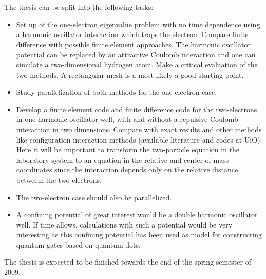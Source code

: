 The thesis can be split into the following tasks:
\begin{itemize}
\item Set up of the one-electron eigenvalue problem with no time dependence using a harmonic 
oscillator interaction which traps the electron. Compare finite difference with possible finite element approaches. The harmonic oscillator potential can be replaced by an attractive Coulomb interaction
and one can simulate a two-dimensional hydrogen atom. Make a critical evaluation of the two
methods.  A rectangular mesh is a most likely a good starting point.
\item Study parallelization  of both methods for the one-electron case.
\item Develop a finite element code and finite difference code for the two-electrons in one harmonic oscillator well, with and without a repulsive Coulomb interaction in two dimensions. Compare with exact results and other methods like configuration interaction methods (available literature and codes at UiO). 
Here it will be important to transform the two-particle equation in the laboratory system to an equation in the relative and center-of-mass coordinates since the interaction depends only on the relative distance betweem the two electrons.

\item The two-electron case should also be parallelized.  

\item 
A confining potential of great interest would be a double harmonic oscillator well.  If time allows,
calculations with such a potential would be very interesting as this confining potential has been used as model for constructing quantum gates based on quantum dots.


\end{itemize}

The thesis is expected to be finished towards the end  of the spring
semester of 2009.












